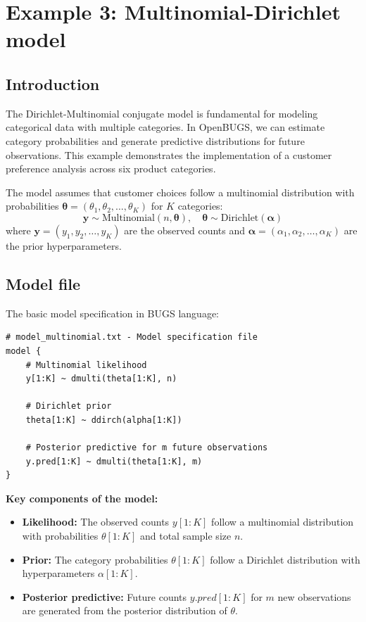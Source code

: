 \section{Example 3: Multinomial-Dirichlet model}

\subsection{Introduction}

The Dirichlet-Multinomial conjugate model is fundamental for modeling categorical data with multiple categories. In OpenBUGS, we can estimate category probabilities and generate predictive distributions for future observations. This example demonstrates the implementation of a customer preference analysis across six product categories.

The model assumes that customer choices follow a multinomial distribution with probabilities $\boldsymbol{\theta} = (\theta_1, \theta_2, \dots, \theta_K)$ for $K$ categories:
\begin{equation}
\mathbf{y} \sim \text{Multinomial}(n, \boldsymbol{\theta}), \quad \boldsymbol{\theta} \sim \text{Dirichlet}(\boldsymbol{\alpha})
\end{equation}
where $\mathbf{y} = (y_1, y_2, \dots, y_K)$ are the observed counts and $\boldsymbol{\alpha} = (\alpha_1, \alpha_2, \dots, \alpha_K)$ are the prior hyperparameters.

\subsection{Model file}

The basic model specification in BUGS language:
\begin{codebox}
\begin{verbatim}
# model_multinomial.txt - Model specification file
model {
    # Multinomial likelihood
    y[1:K] ~ dmulti(theta[1:K], n)

    # Dirichlet prior
    theta[1:K] ~ ddirch(alpha[1:K])

    # Posterior predictive for m future observations
    y.pred[1:K] ~ dmulti(theta[1:K], m)
}
\end{verbatim}
\end{codebox}
\textbf{Key components of the model:}
\begin{itemize}
\item \textbf{Likelihood:} The observed counts $y[1:K]$ follow a multinomial distribution with probabilities $\theta[1:K]$ and total sample size $n$.
\item \textbf{Prior:} The category probabilities $\theta[1:K]$ follow a Dirichlet distribution with hyperparameters $\alpha[1:K]$.
\item \textbf{Posterior predictive:} Future counts $y.pred[1:K]$ for $m$ new observations are generated from the posterior distribution of $\theta$.
\end{itemize}

